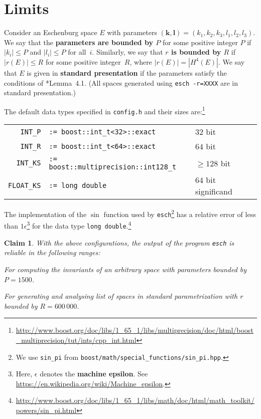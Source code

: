 \documentclass{article}
\newtheorem{claim}{Claim}
\newcommand{\abs}[1]{\left|#1\right|}
\renewcommand{\vec}[1]{\mathbf{#1}}
\newcommand{\macheps}{\epsilon} %
\begin{document}
\section*{Limits}
Consider an Eschenburg space \(E\) with parameters \((\vec k,\vec l) = (k_1,k_2,k_3,l_1,l_2,l_3)\).   We say that the \textbf{parameters are bounded by \(P\)} for some positive integer \(P\) if \(\abs{k_i}\leq P\) and \(\abs{l_i}\leq P\) for all~\(i\).  Similarly, we say that \textbf{\(r\) is bounded by \(R\)} if \(\abs{r(E)}\leq R\) for some positive integer~\(R\), where  \(\abs{r(E)} = |H^4(E)|\).  We say that \(E\) is given in \textbf{standard presentation} if the parameters satisfy the conditions of \cite{CEZ}*{Lemma~4.1}.  (All spaces generated using \verb+esch -r=XXXX+ are in standard presentation.)

The default data types specified in \verb+config.h+ and their sizes are:\footnote{
  \mbox{\url{http://www.boost.org/doc/libs/1_65_1/libs/multiprecision/doc/html/boost_multiprecision/tut/ints/cpp_int.html}}%
}

  \begin{tabular}{rp{22em}l}
    \verb+INT_P+ & \verb+:= boost::int_t<32>::exact+ & \(32\) bit \\
    \verb+INT_R+ & \verb+:= boost::int_t<64>::exact+ & \(64\) bit \\
    \verb+INT_KS+ & \verb+:= boost::multiprecision::int128_t+ & \(\geq 128\) bit \\
    \verb+FLOAT_KS+ & \verb+:= long double+ & \(64\) bit significand
  \end{tabular}

The implementation of the \(\sin\) function used by \verb+esch+\footnote{
  We use \verb+sin_pi+ from \verb+boost/math/special_functions/sin_pi.hpp+.%
}
has a relative error of less than \(1\macheps\)\footnote{
  Here, \(\macheps\) denotes the \textbf{machine epsilon}.
  See \url{https://en.wikipedia.org/wiki/Machine_epsilon}.%
}
for the data type \texttt{long double}.\footnote{
  \mbox{\url{http://www.boost.org/doc/libs/1_65_1/libs/math/doc/html/math_toolkit/powers/sin_pi.html}}%
}

\begin{claim}\label{claim:default}
  With the above configurations, the output of the program \verb+esch+ is reliable in the following ranges:
  \begin{compactitem}
  \item For computing the invariants of an arbitrary space with parameters bounded by \(P=1500\).
  \item For generating and analysing list of spaces in standard parametrization with \(r\) bounded by \(R=600\,000\).
  \end{compactitem}
\end{claim}
\end{document}
